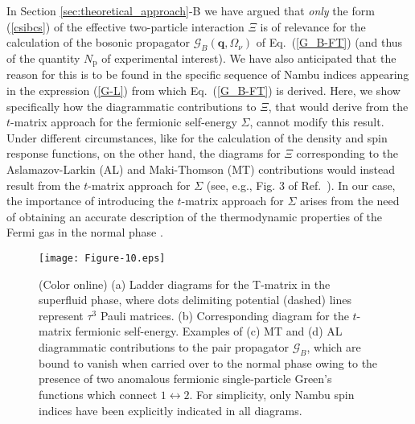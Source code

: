 \documentclass[pra,twocolumn,aps,amssymb,showpacs,superscriptaddress]{revtex4-1}
\begin{document}
In Section \ref{sec:theoretical_approach}-B we have argued that \emph{only} the form (\ref{csibcs}) of the effective two-particle interaction $\Xi$ is of relevance for the calculation of the bosonic propagator
$\mathcal{G}_{B}(\mathbf{q},\Omega_{\nu})$ of Eq.~(\ref{G_B-FT}) (and thus of the quantity $N_{\mathrm{p}}$ of experimental interest).
We have also anticipated that the reason for this is to be found in the specific sequence of Nambu indices appearing in the expression (\ref{G-L}) from which Eq.~(\ref{G_B-FT}) is derived.
Here, we show specifically how the diagrammatic contributions to $\Xi$, that would derive from the $t$-matrix approach for the fermionic self-energy $\Sigma$, cannot modify this result.
Under different circumstances, like for the calculation of the density and spin response functions, on the other hand, the diagrams for $\Xi$ corresponding to the Aslamazov-Larkin (AL) and Maki-Thomson (MT) 
contributions would instead result from the $t$-matrix approach for $\Sigma$ (see, e.g., Fig. 3 of Ref.~\cite{SPL-2002}).
In our case, the importance of introducing the $t$-matrix approach for $\Sigma$ arises from the need of obtaining an accurate description of the thermodynamic properties of the Fermi gas in the normal phase \cite{PPS-2019}.

\begin{figure}[t]
\begin{center}
\texttt{[image: Figure-10.eps]}
\caption{(Color online) 
(a) Ladder diagrams for the T-matrix in the superfluid phase, where dots delimiting potential (dashed) lines represent $\tau^{3}$ Pauli matrices.
(b) Corresponding diagram for the $t$-matrix fermionic self-energy.  Examples of (c) MT and (d) AL diagrammatic contributions to the pair propagator $\mathcal{G}_{B}$, 
 which are bound to vanish when carried over to the normal phase owing to the presence of two anomalous fermionic single-particle Green's functions which connect $1 \leftrightarrow 2$.
For simplicity, only Nambu spin indices have been explicitly indicated in all diagrams.}
\label{Figure-10}
\end{center}
\end{figure} 
\end{document}
